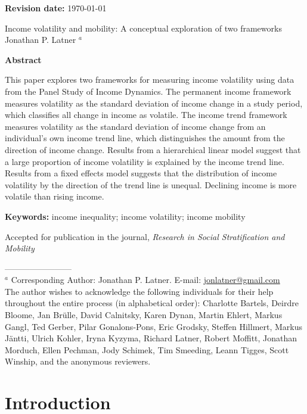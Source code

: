 \documentclass[12pt]{article}
\begin{document}
\afterpage{\cfoot{\thepage}}

{\bf  Revision date:} \today

\begin{center}
\large Income volatility and mobility: A conceptual exploration of two frameworks \\
\bigskip
\normalsize
Jonathan P. Latner $^{a}$\\
\end{center}

{\bf  Abstract}

This paper explores two frameworks for measuring income volatility using data from the Panel Study of Income Dynamics. The permanent income framework measures volatility as the standard deviation of income change in a study period, which classifies all change in income as volatile. The income trend framework measures volatility as the standard deviation of income change from an individual's own income trend line, which distinguishes the amount from the direction of income change. Results from a hierarchical linear model suggest that a large proportion of income volatility is explained by the income trend line. Results from a fixed effects model suggests that the distribution of income volatility by the direction of the trend line is unequal. Declining income is more volatile than rising income. 

{\bf  Keywords:} income inequality; income volatility; income mobility

Accepted for publication in the journal, \emph{Research in Social Stratification and Mobility}

\vfill

------------------------ \\
\footnotesize
$^{a}$ Corresponding Author: Jonathan P. Latner.  E-mail:  \url{jonlatner@gmail.com}\\
The author wishes to acknowledge the following individuals for their help throughout the entire process (in alphabetical order):  Charlotte Bartels, Deirdre Bloome, Jan Br{\"u}lle, David Calnitsky, Karen Dynan, Martin Ehlert, Markus Gangl, Ted Gerber, Pilar Gonalons-Pons, Eric Grodsky, Steffen Hillmert, Markus J{\"a}ntti, Ulrich Kohler, Iryna Kyzyma, Richard Latner, Robert Moffitt, Jonathan Morduch, Ellen Pechman, Jody Schimek, Tim Smeeding, Leann Tigges, Scott Winship, and the anonymous reviewers.

\clearpage
\doublespacing
\section{Introduction}
\normalsize
\end{document}
